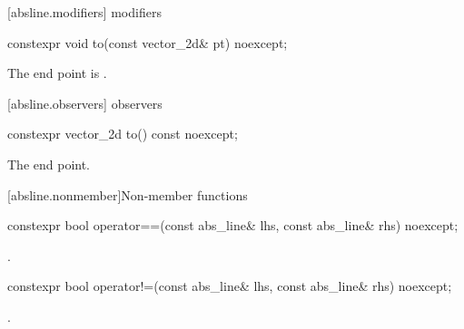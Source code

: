  [absline.modifiers]{ modifiers}%

%
\begin{itemdecl}
constexpr void to(const vector_2d& pt) noexcept;
\end{itemdecl}
\begin{itemdescr}
\pnum
\effects
The end point is .
\end{itemdescr}

 [absline.observers]{ observers}%

%
\begin{itemdecl}
constexpr vector_2d to() const noexcept;
\end{itemdecl}
\begin{itemdescr}
\pnum
\returns
The end point.
\end{itemdescr}

 [absline.nonmember]{Non-member functions}%

%
\begin{itemdecl}
constexpr bool operator==(const abs_line& lhs, const abs_line& rhs) noexcept;
\end{itemdecl}
\begin{itemdescr}
\pnum
\returns
{}.
\end{itemdescr}

%
\begin{itemdecl}
constexpr bool operator!=(const abs_line& lhs, const abs_line& rhs) noexcept;
\end{itemdecl}
\begin{itemdescr}
\pnum
\returns
{}.
\end{itemdescr}
